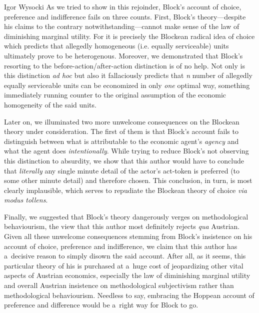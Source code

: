 \begin{artengenv}{Igor Wysocki}
As we tried to show in this rejoinder, Block's account of choice, preference and indifference fails on three counts. First, Block's theory---despite his claims to the contrary notwithstanding---cannot make sense of the law of diminishing marginal utility. For it is precisely the Blockean radical idea of choice which predicts that allegedly homogeneous (i.e. equally serviceable) units ultimately prove to be heterogenous. Moreover, we demonstrated that Block's resorting to the before-action/after-action distinction is of no help. Not only is this distinction \textit{ad hoc} but also it fallaciously predicts that \textit{n} number of allegedly equally serviceable units can be economized in only \textit{one} optimal way, something immediately running counter to the original assumption of the economic homogeneity of the said units.



Later on, we illuminated two more unwelcome consequences on the Blockean theory under consideration. The first of them is that Block's 
\parencite*[][]{block_response_2022} %
 account fails to distinguish between what is attributable to the economic agent's \textit{agency} and what the agent does \textit{intentionally}. While trying to reduce Block's not observing this distinction to absurdity, we show that this author would have to conclude that \textit{literally} any single minute detail of the actor's act-token is preferred (to some other minute detail) and therefore chosen. This conclusion, in turn, is most clearly implausible, which serves to repudiate the Blockean theory of choice \textit{via modus tollens}.



Finally, we suggested that Block's theory dangerously verges on methodological behaviourism, the view that this author most definitely rejects \textit{qua} Austrian. Given all these unwelcome consequences stemming from Block's insistence on his account of choice, preference and indifference, we claim that this author has a~decisive reason to simply disown the said account. After all, as it seems, this particular theory of his is purchased at a~huge cost of jeopardizing other vital aspects of Austrian economics, especially the law of diminishing marginal utility and overall Austrian insistence on methodological subjectivism rather than methodological behaviourism. Needless to say, embracing the Hoppean 
\parencite*[][]{hoppe_must_2005} %
 account of preference and difference would be a~right way for Block to go.





\end{artengenv}

